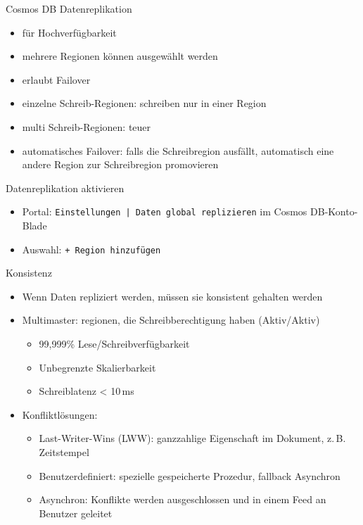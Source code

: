 \begin{flashcard}[Definition]{Cosmos DB Datenreplikation}
    \begin{itemize}
        \item für Hochverfügbarkeit
        \item mehrere Regionen können ausgewählt werden
        \item erlaubt Failover
        \item einzelne Schreib-Regionen: schreiben nur in einer Region
        \item multi Schreib-Regionen: teuer
        \item automatisches Failover: falls die Schreibregion ausfällt, automatisch eine andere Region zur Schreibregion promovieren
    \end{itemize}
\end{flashcard}

\begin{flashcard}[Definition]{Datenreplikation aktivieren}
    \begin{itemize}
        \item Portal: \texttt{Einstellungen | Daten global replizieren} im Cosmos DB-Konto-Blade
        \item Auswahl: \texttt{+ Region hinzufügen}
    \end{itemize}
\end{flashcard}

\begin{flashcard}[Definition]{Konsistenz}
    \begin{itemize}
        \item Wenn Daten repliziert werden, müssen sie konsistent gehalten werden
        \item Multimaster: regionen, die Schreibberechtigung haben (Aktiv/Aktiv)
        \begin{itemize}
            \item 99,999\% Lese/Schreibverfügbarkeit
            \item Unbegrenzte Skalierbarkeit
            \item Schreiblatenz < 10\,ms
        \end{itemize}
        \item Konfliktlösungen:
        \begin{itemize}
            \item Last-Writer-Wins (LWW): ganzzahlige Eigenschaft im Dokument, z.\,B. Zeitstempel
            \item Benutzerdefiniert: spezielle gespeicherte Prozedur, fallback Asynchron
            \item Asynchron: Konflikte werden ausgeschlossen und in einem Feed an Benutzer geleitet
        \end{itemize}
    \end{itemize}
\end{flashcard}

